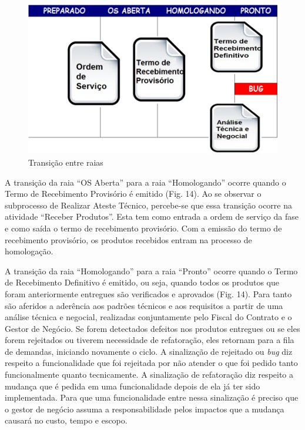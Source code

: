 \begin{figure}[H]
		\centering
		\label{fig07}
			\includegraphics[scale=0.5]{figuras/kanbanIPHAN3.png}
		\caption{Transição entre raias \cite{parente}}
\end{figure}

A transição da raia “OS Aberta” para a raia “Homologando” ocorre quando o Termo de Recebimento Provisório é emitido (Fig. 14). Ao se observar o subprocesso de Realizar Ateste Técnico, percebe-se que essa transição ocorre na atividade “Receber Produtos”. Esta tem como entrada a ordem de serviço da fase e como saída o termo de recebimento provisório. Com a emissão do termo de recebimento provisório, os produtos recebidos entram na processo de homologação. 

A transição da raia “Homologando” para a raia “Pronto” ocorre quando o Termo de Recebimento Definitivo é emitido, ou seja, quando todos os produtos que foram anteriormente entregues são verificados e aprovados (Fig. 14). Para tanto são aferidos a aderência aos padrões técnicos e aos requisitos a partir de uma análise técnica e negocial, realizadas conjuntamente pelo Fiscal do Contrato e o Gestor de Negócio. Se forem detectados defeitos nos produtos entregues ou se eles forem rejeitados ou tiverem necessidade de refatoração, eles retornam para a fila de demandas, iniciando novamente o ciclo. A sinalização de rejeitado ou \textit{bug} diz respeito a funcionalidade que foi rejeitada por não atender o que foi pedido tanto funcionalmente quanto tecnicamente. A sinalização de refatoração diz respeito a mudança que é pedida em uma funcionalidade depois de ela já ter sido implementada. Para que uma funcionalidade entre nessa sinalização é preciso que o gestor de negócio assuma a responsabilidade pelos impactos que a mudança causará no custo, tempo e escopo.

